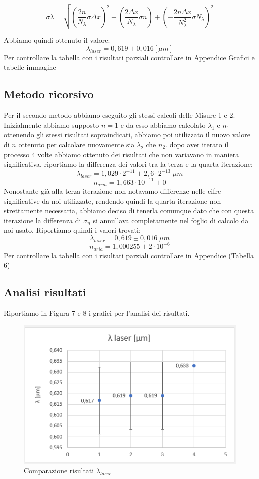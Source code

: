 \documentclass{article}
\begin{document}
\begin{equation} 
\sigma\lambda= \sqrt{(\frac{2 n}{N_\lambda} \sigma\Delta x)^2 + (\frac{2 \Delta x}{N_\lambda} \sigma n) + ({-} \frac{2 n \Delta x}{N_\lambda^2} \sigma{N_\lambda})^2} 
\end{equation}

Abbiamo quindi ottenuto il valore:
\[ \lambda_{laser} = 0,619 \pm 0,016 [\mu m] \]
Per controllare la tabella con i risultati parziali controllare in Appendice Grafici e tabelle immagine %



\subsection{Metodo ricorsivo}
Per il secondo metodo abbiamo eseguito gli stessi calcoli delle Misure 1 e 2. Inizialmente abbiamo supposto $n = 1$ e da esso abbiamo calcolato $\lambda_1$ e $n_1$ ottenendo gli stessi risultati sopraindicati, abbiamo poi utilizzato il nuovo valore di $n$ ottenuto per calcolare nuovamente sia $\lambda_2$ che $n_2$. dopo aver iterato il processo 4 volte abbiamo ottenuto dei risultati che non variavano in maniera significativa, riportiamo la differenza dei valori tra la terza e la quarta iterazione:
\[ \lambda_{laser} = 1,029 \cdot 2^{-11} \pm 2,6 \cdot 2^{-13} \; \mu m \]
\[ n_{aria} = 1,663 \cdot 10^{-11} \pm 0 \]
Nonostante già alla terza iterazione non notavamo differenze nelle cifre significative da noi utilizzate, rendendo quindi la quarta iterazione non strettamente necessaria, abbiamo deciso di tenerla comunque dato che con questa iterazione la differenza di $\sigma_n$ si annullava completamente nel foglio di calcolo da noi usato. Riportiamo quindi i valori trovati:
\[ \lambda_{laser} = 0,619 \pm 0,016 \; \mu m \]
\[ n_{aria} = 1,000255 \pm 2 \cdot 10^{-6} \]
Per controllare la tabella con i risultati parziali controllare in Appendice (Tabella 6)



\subsection{Analisi risultati}
Riportiamo in Figura 7 e 8 i grafici per l'analisi dei risultati.

\begin{figure}[h!]
  \centering
  \includegraphics[width=0.6\linewidth]{IM grafico risultati lambda}
  \caption{Comparazione risultati $\lambda_{laser}$}
\end{figure}
\end{document}
